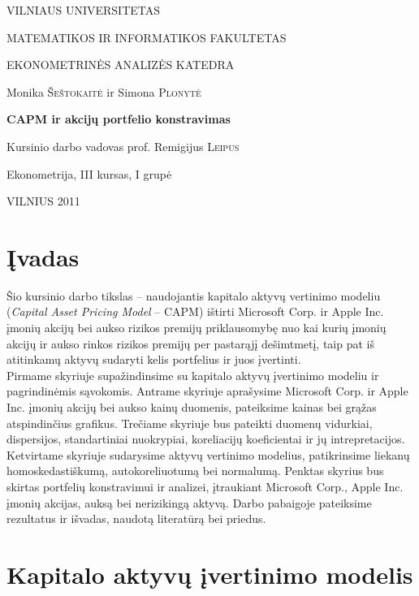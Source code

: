 \documentclass[12pt, a14paper, lithuanian]{article}
\begin{document}
\begin{titlepage}
\centerline{ \large VILNIAUS UNIVERSITETAS}
\bigskip
\centerline{\large MATEMATIKOS IR INFORMATIKOS FAKULTETAS}
\smallskip

\centerline{\large  EKONOMETRINĖS ANALIZĖS KATEDRA}
\vskip 200pt
\centerline{ \large Monika \textsc{Šeštokaitė} ir \large Simona \textsc{Plonytė}}
\vskip 50pt
\centerline{\bf \Large CAPM ir akcijų portfelio konstravimas}
\bigskip
\vskip 25pt
\centerline{Kursinio darbo vadovas prof. \large {Remigijus} \textsc{Leipus}}
\vskip 25pt
\hfill Ekonometrija, III kursas, I grupė
\vskip 100pt
\centerline{\large VILNIUS 2011}
\end{titlepage}



\tableofcontents
\newpage




\newcommand{\sectionnonum}[1]{%
    \section*{#1}%
    \addcontentsline{toc}{section}{#1}%
}
\sectionnonum{Įvadas}

Šio kursinio darbo tikslas -- naudojantis kapitalo aktyvų vertinimo modeliu (\textit{Capital Asset Pricing Model} -- CAPM) ištirti Microsoft Corp. ir Apple Inc. įmonių akcijų bei aukso rizikos premijų priklausomybę nuo kai kurių įmonių akcijų ir aukso rinkos rizikos premijų per pastarąjį dešimtmetį, taip pat iš atitinkamų aktyvų sudaryti kelis portfelius ir juos įvertinti. \\

Pirmame skyriuje supažindinsime su kapitalo aktyvų įvertinimo modeliu ir pagrindinėmis sąvokomis. Antrame skyriuje aprašysime Microsoft Corp. ir Apple Inc. įmonių akcijų bei aukso kainų duomenis, pateiksime kainas bei grąžas atspindinčius grafikus. Trečiame skyriuje bus pateikti duomenų vidurkiai, dispersijos, standartiniai nuokrypiai, koreliacijų koeficientai ir jų intrepretacijos. Ketvirtame skyriuje sudarysime aktyvų vertinimo modelius, patikrinsime liekanų homoskedastiškumą, autokoreliuotumą bei normalumą. Penktas skyrius bus skirtas portfelių konstravimui ir analizei, įtraukiant Microsoft Corp., Apple Inc. įmonių akcijas, auksą bei nerizikingą aktyvą. Darbo pabaigoje pateiksime rezultatus ir išvadas, naudotą literatūrą bei priedus.

\newpage

\section{Kapitalo aktyvų įvertinimo modelis}
\end{document}
